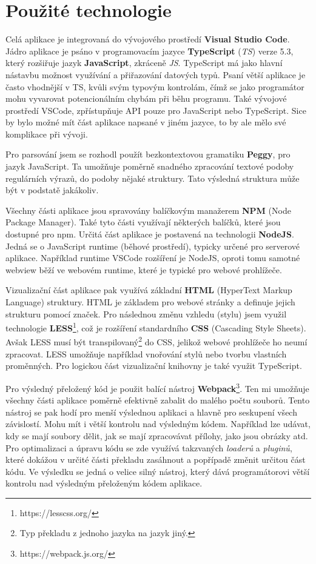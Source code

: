 \newpage

\section{Použité technologie}\label{sec:USEDtech}
Celá aplikace je integrovaná do vývojového prostředí \textbf{Visual Studio Code}. 
Jádro aplikace je psáno v programovacím jazyce \textbf{TypeScript} (\textit{TS}) verze 5.3, který rozšiřuje jazyk \textbf{JavaScript}, zkráceně \textit{JS}. 
TypeScript má jako hlavní nástavbu možnost využívání a přiřazování datových typů.
Psaní větší aplikace je často vhodnější v TS, kvůli svým typovým kontrolám, čímž se jako programátor mohu vyvarovat potencionálním chybám při běhu programu.
Také vývojové prostředí VSCode, zpřístupňuje API pouze pro JavaScript nebo TypeScript.
Sice by bylo možné mít část aplikace napsané v jiném jazyce, to by ale mělo své komplikace při vývoji.

Pro parsování jsem se rozhodl použít bezkontextovou gramatiku \textbf{Peggy}\cite{Peggy, Peggyjs}, pro jazyk JavaScript.
Ta umožňuje poměrně snadného zpracování textové podoby regulárních výrazů, do podoby nějaké struktury.
Tato výsledná struktura může být v podstatě jakákoliv.

Všechny části aplikace jsou spravovány balíčkovým manažerem \textbf{NPM} (Node Package Manager).
Také tyto části využívají některých balíčků, které jsou dostupné pro npm. 
Určitá část aplikace je postavená na technologii \textbf{NodeJS}.
Jedná se o JavaScript runtime (běhové prostředí), typicky určené pro serverové aplikace. 
Například runtime VSCode rozšíření je NodeJS, oproti tomu samotné webview běží ve webovém runtime, které je typické pro webové prohlížeče.

Vizualizační část aplikace pak využívá základní \textbf{HTML} (HyperText Markup Language) struktury.  
HTML je základem pro webové stránky a definuje jejich strukturu pomocí značek.
Pro následnou změnu vzhledu (stylu) jsem využil technologie \textbf{LESS}\footnote{https://lesscss.org/}, což je rozšíření standardního \textbf{CSS} (Cascading Style Sheets).
Avšak LESS musí být transpilovaný\footnote{Typ překladu z jednoho jazyka na jazyk jiný.} do CSS, jelikož webové prohlížeče ho neumí zpracovat. 
LESS umožňuje například vnořování stylů nebo tvorbu vlastních proměnných.
Pro logickou část vizualizační knihovny je také využit TypeScript.

Pro výsledný přeložený kód je použit balící nástroj \textbf{Webpack}\footnote{https://webpack.js.org/}.
Ten mi umožňuje všechny části aplikace poměrně efektivně zabalit do malého počtu souborů. 
Tento nástroj se pak hodí pro menší výslednou aplikaci a hlavně pro seskupení všech závislostí.
Mohu mít i větší kontrolu nad výsledným kódem.
Například lze udávat, kdy se mají soubory dělit, jak se mají zpracovávat přílohy, jako jsou obrázky atd.
Pro optimalizaci a úpravu kódu se zde využívá takzvaných \textit{loaderů} a \textit{pluginů}, 
které dokážou v určité části překladu zasáhnout a popřípadě změnit určitou část kódu.
Ve výsledku se jedná o velice silný nástroj, který dává programátorovi větší kontrolu nad výsledným přeloženým kódem aplikace.

